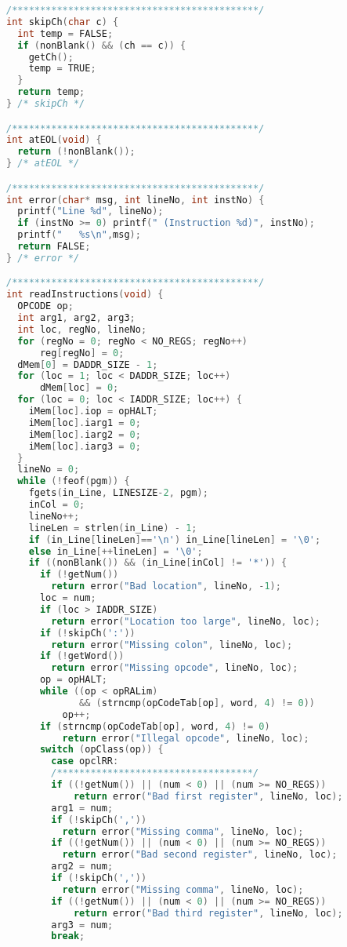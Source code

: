 \documentclass[lang=cn,10pt]{elegantbook}
\begin{document}
\begin{lstlisting}[caption={tm.c},language=c]
/********************************************/
int skipCh(char c) {
  int temp = FALSE;
  if (nonBlank() && (ch == c)) {
    getCh();
    temp = TRUE;
  }
  return temp;
} /* skipCh */

/********************************************/
int atEOL(void) {
  return (!nonBlank());
} /* atEOL */

/********************************************/
int error(char* msg, int lineNo, int instNo) {
  printf("Line %d", lineNo);
  if (instNo >= 0) printf(" (Instruction %d)", instNo);
  printf("   %s\n",msg);
  return FALSE;
} /* error */

/********************************************/
int readInstructions(void) {
  OPCODE op;
  int arg1, arg2, arg3;
  int loc, regNo, lineNo;
  for (regNo = 0; regNo < NO_REGS; regNo++)
      reg[regNo] = 0;
  dMem[0] = DADDR_SIZE - 1;
  for (loc = 1; loc < DADDR_SIZE; loc++)
      dMem[loc] = 0;
  for (loc = 0; loc < IADDR_SIZE; loc++) {
    iMem[loc].iop = opHALT;
    iMem[loc].iarg1 = 0;
    iMem[loc].iarg2 = 0;
    iMem[loc].iarg3 = 0;
  }
  lineNo = 0;
  while (!feof(pgm)) {
    fgets(in_Line, LINESIZE-2, pgm);
    inCol = 0;
    lineNo++;
    lineLen = strlen(in_Line) - 1;
    if (in_Line[lineLen]=='\n') in_Line[lineLen] = '\0';
    else in_Line[++lineLen] = '\0';
    if ((nonBlank()) && (in_Line[inCol] != '*')) {
      if (!getNum())
        return error("Bad location", lineNo, -1);
      loc = num;
      if (loc > IADDR_SIZE)
        return error("Location too large", lineNo, loc);
      if (!skipCh(':'))
        return error("Missing colon", lineNo, loc);
      if (!getWord())
        return error("Missing opcode", lineNo, loc);
      op = opHALT;
      while ((op < opRALim)
             && (strncmp(opCodeTab[op], word, 4) != 0))
          op++;
      if (strncmp(opCodeTab[op], word, 4) != 0)
          return error("Illegal opcode", lineNo, loc);
      switch (opClass(op)) {
        case opclRR:
        /***********************************/
        if ((!getNum()) || (num < 0) || (num >= NO_REGS))
            return error("Bad first register", lineNo, loc);
        arg1 = num;
        if (!skipCh(','))
          return error("Missing comma", lineNo, loc);
        if ((!getNum()) || (num < 0) || (num >= NO_REGS))
          return error("Bad second register", lineNo, loc);
        arg2 = num;
        if (!skipCh(','))
          return error("Missing comma", lineNo, loc);
        if ((!getNum()) || (num < 0) || (num >= NO_REGS))
            return error("Bad third register", lineNo, loc);
        arg3 = num;
        break;


\end{lstlisting}
\end{document}
